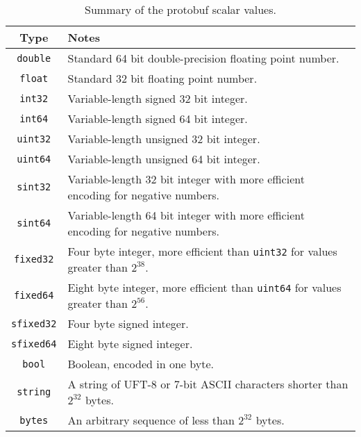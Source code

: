 \documentclass[11pt]{article}
\theoremstyle{definition}
\theoremstyle{plain}
\begin{document}
\begin{table}[H]
	\centering
	\begin{tabular}{cl}
		\toprule
		Type              & Notes                                                    \\
		\midrule
		\texttt{double}   & Standard 64 bit double-precision floating point
		number.                                                                      \\
		\texttt{float}    & Standard 32 bit floating point number.                   \\
		\texttt{int32}    & Variable-length signed 32 bit integer.                   \\
		\texttt{int64}    & Variable-length signed 64 bit integer.                   \\
		\texttt{uint32}   & Variable-length unsigned 32 bit integer.                 \\
		\texttt{uint64}   & Variable-length unsigned 64 bit integer.                 \\
		\texttt{sint32}   & Variable-length 32 bit integer with more
		efficient encoding for negative numbers.                                     \\
		\texttt{sint64}   & Variable-length 64 bit integer with more efficient
		encoding for negative numbers.                                               \\
		\texttt{fixed32}  & Four byte integer, more efficient than \texttt{uint32}
		for values greater than $2^{38}$.                                            \\
		\texttt{fixed64}  & Eight byte integer, more efficient than \texttt{uint64}
		for values greater than $2^{56}$.                                            \\
		\texttt{sfixed32} & Four byte signed integer.                                \\
		\texttt{sfixed64} & Eight byte signed integer.                               \\
		\texttt{bool}     & Boolean, encoded in one byte.                            \\
		\texttt{string}   & A string of UFT-8 or 7-bit ASCII characters shorter than
		$2^{32}$ bytes.                                                              \\
		\texttt{bytes}    & An arbitrary sequence of less than $2^{32}$ bytes.       \\
		\bottomrule
	\end{tabular}
	\caption{Summary of the protobuf scalar values.}
	\label{tbl:proto-prim}
\end{table}
\end{document}
